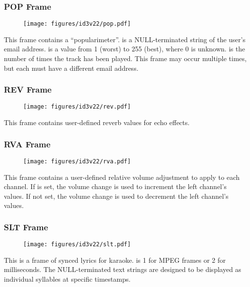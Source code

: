 \subsubsection{POP Frame}
\begin{figure}[h]
\texttt{[image: figures/id3v22/pop.pdf]}
\end{figure}
This frame contains a ``popularimeter''.
 is a NULL-terminated string of the user's email address.
 is a value from 1 (worst) to 255 (best), where 0 is unknown.
 is the number of times the track has been played.
This frame may occur multiple times, but each must have a different email
address.

\clearpage

\subsubsection{REV Frame}
\begin{figure}[h]
\texttt{[image: figures/id3v22/rev.pdf]}
\end{figure}
This frame contains user-defined reverb values for echo effects.

\subsubsection{RVA Frame}
\begin{figure}[h]
\texttt{[image: figures/id3v22/rva.pdf]}
\end{figure}
This frame contains a user-defined relative volume adjustment
to apply to each channel.
If  is set, the volume change is used to increment
the left channel's values.
If not set, the volume change is used to decrement the left channel's
values.

\subsubsection{SLT Frame}
\begin{figure}[h]
\texttt{[image: figures/id3v22/slt.pdf]}
\end{figure}
This is a frame of synced lyrics for karaoke.
 is 1 for MPEG frames or 2 for milliseconds.
The NULL-terminated text strings are designed to be displayed
as individual syllables at specific timestamps.

